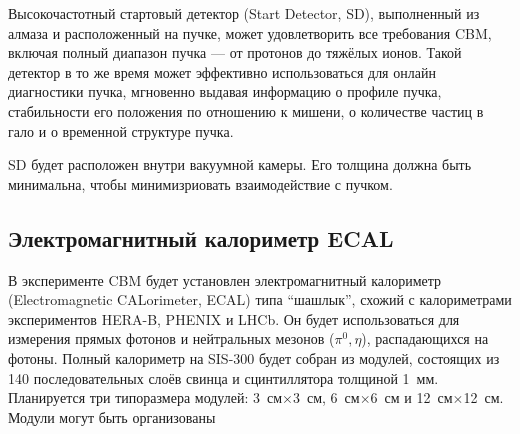 Высокочастотный стартовый детектор (Start Detector, SD), выполненный из алмаза и расположенный на пучке, может удовлетворить все требования CBM, включая полный диапазон пучка --- от протонов до тяжёлых ионов.
Такой детектор в то же время может эффективно использоваться для онлайн диагностики пучка, мгновенно выдавая информацию о профиле пучка, стабильности его положения по отношению к мишени, о количестве частиц в гало \todo и о временной структуре пучка.


SD будет расположен внутри вакуумной камеры. Его толщина должна быть минимальна, чтобы минимизриовать взаимодействие с пучком.



\subsection{Электромагнитный калориметр ECAL}\label{sec:secECAL}

В эксперименте CBM будет установлен электромагнитный калориметр (Electromagnetic CALorimeter, ECAL) типа ``шашлык'', схожий с калориметрами экспериментов HERA-B, PHENIX и LHCb. Он будет использоваться для измерения прямых фотонов и нейтральных мезонов ($ \pi^{0}, \eta $), распадающихся на фотоны. Полный калориметр на SIS-300 будет собран из модулей, состоящих из 140 последовательных слоёв свинца и сцинтиллятора толщиной 1~мм. Планируется три типоразмера модулей: 3~см$\times$3~см, 6~см$\times$6~см и 12~см$\times$12~см. Модули могут быть организованы

